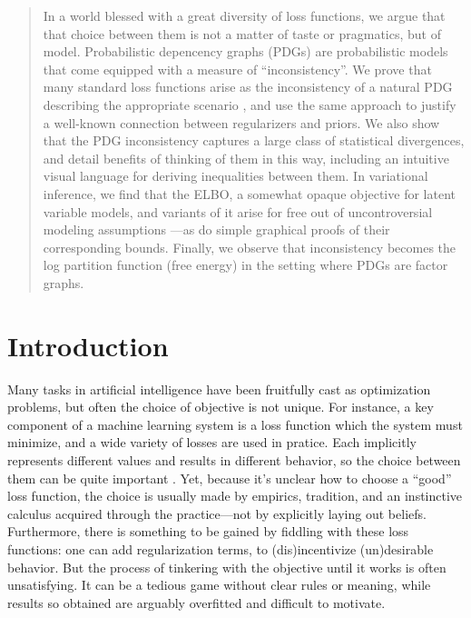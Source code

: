 \let\parencite\cite
\let\textcite\citet
\newcommand{\ssub}[1]{_{\!_{#1}\!}}


\begin{abstract}
    In a world blessed with a great diversity of loss functions,
    we argue that that choice between them is not a matter of taste or pragmatics, but of model.
	Probabilistic depencency graphs (PDGs) are probabilistic models that come equipped with a measure of ``inconsistency''.
    We prove that many standard loss functions arise as the inconsistency of
    a natural PDG describing the appropriate scenario%
	, and use the same approach
	to justify a well-known
		connection between regularizers and priors.
    We also show that the PDG inconsistency captures a
    large class of statistical divergences, and detail benefits of
	thinking of them in this way, including an intuitive
    visual language for deriving inequalities between them.
	In variational inference, we find
	that the ELBO, a somewhat opaque objective for latent variable
    models, and variants of it
	arise for free out of uncontroversial modeling assumptions%
	---as do simple graphical proofs of their corresponding bounds.
	Finally, we observe that inconsistency becomes the log partition function (free energy) in the setting where PDGs are factor graphs.
\end{abstract}

\section{Introduction}
Many tasks in artificial intelligence have been fruitfully cast as optimization problems, but often the choice of objective is not unique.
For instance, a key component of a machine learning system is a loss
function which the system must minimize,
and a wide variety of losses are used in pratice.
Each implicitly represents different values and results in different
behavior, so the choice between them can be quite important
\parencite{wang2020comprehensive,jadon2020survey}.
Yet,
because it's unclear how to choose a ``good'' loss function,
the choice is usually made by empirics, tradition, and an instinctive calculus acquired through the practice---not by explicitly laying out beliefs.
Furthermore, there is something to be gained by fiddling with these
loss functions: one can add regularization terms, to (dis)incentivize
(un)desirable behavior.
But the process of tinkering with the objective until it works is often unsatisfying.
It can be a tedious game without clear rules or meaning,
 while results so obtained are arguably overfitted and difficult to motivate.



